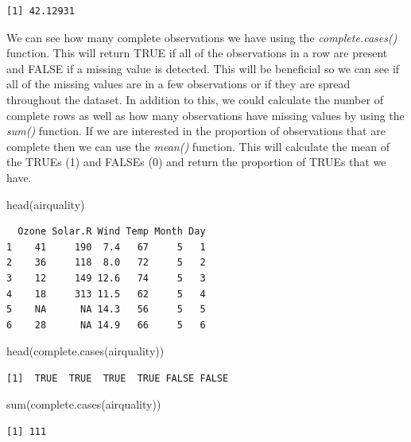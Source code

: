 \documentclass[
  letterpaper,
  DIV=11,
  numbers=noendperiod]{scrreprt}
\newenvironment{Shaded}{\begin{snugshade}}{\end{snugshade}}
\newcommand{\FunctionTok}[1]{\textcolor[rgb]{0.28,0.35,0.67}{#1}}
\newcommand{\NormalTok}[1]{\textcolor[rgb]{0.00,0.23,0.31}{#1}}
\begin{document}
\begin{verbatim}
[1] 42.12931
\end{verbatim}

We can see how many complete observations we have using the
\emph{complete.cases()} function. This will return TRUE if all of the
observations in a row are present and FALSE if a missing value is
detected. This will be beneficial so we can see if all of the missing
values are in a few observations or if they are spread throughout the
dataset. In addition to this, we could calculate the number of complete
rows as well as how many observations have missing values by using the
\emph{sum()} function. If we are interested in the proportion of
observations that are complete then we can use the \emph{mean()}
function. This will calculate the mean of the TRUEs (1) and FALSEs (0)
and return the proportion of TRUEs that we have.

\begin{Shaded}
\begin{Highlighting}[]
\FunctionTok{head}\NormalTok{(airquality)}
\end{Highlighting}
\end{Shaded}

\begin{verbatim}
  Ozone Solar.R Wind Temp Month Day
1    41     190  7.4   67     5   1
2    36     118  8.0   72     5   2
3    12     149 12.6   74     5   3
4    18     313 11.5   62     5   4
5    NA      NA 14.3   56     5   5
6    28      NA 14.9   66     5   6
\end{verbatim}

\begin{Shaded}
\begin{Highlighting}[]
\FunctionTok{head}\NormalTok{(}\FunctionTok{complete.cases}\NormalTok{(airquality))}
\end{Highlighting}
\end{Shaded}

\begin{verbatim}
[1]  TRUE  TRUE  TRUE  TRUE FALSE FALSE
\end{verbatim}

\begin{Shaded}
\begin{Highlighting}[]
\FunctionTok{sum}\NormalTok{(}\FunctionTok{complete.cases}\NormalTok{(airquality))}
\end{Highlighting}
\end{Shaded}

\begin{verbatim}
[1] 111
\end{verbatim}
\end{document}
